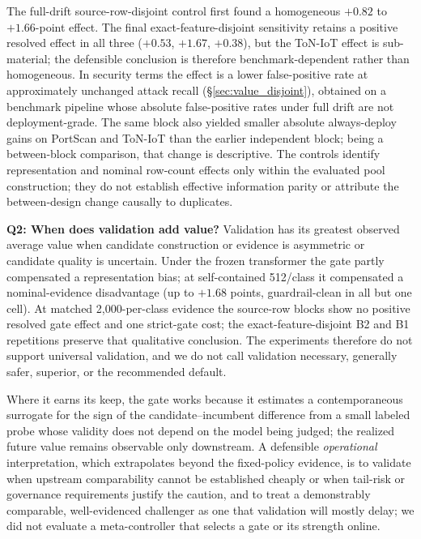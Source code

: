 \documentclass[a4paper,fleqn]{cas-sc}
\begin{document}
The full-drift source-row-disjoint control first found a homogeneous $+0.82$ to $+1.66$-point effect. The final exact-feature-disjoint sensitivity retains a positive resolved effect in all three ($+0.53$, $+1.67$, $+0.38$), but the ToN-IoT effect is sub-material; the defensible conclusion is therefore benchmark-dependent rather than homogeneous. In security terms the effect is a lower false-positive rate at approximately unchanged attack recall (\S\ref{sec:value_disjoint}), obtained on a benchmark pipeline whose absolute false-positive rates under full drift are not deployment-grade. The same block also yielded smaller absolute always-deploy gains on PortScan and ToN-IoT than the earlier independent block; being a between-block comparison, that change is descriptive. The controls identify representation and nominal row-count effects only within the evaluated pool construction; they do not establish effective information parity or attribute the between-design change causally to duplicates.

\textbf{Q2: When does validation add value?} Validation has its greatest observed average value when candidate construction or evidence is asymmetric or candidate quality is uncertain. Under the frozen transformer the gate partly compensated a representation bias; at self-contained 512/class it compensated a nominal-evidence disadvantage (up to $+1.68$ points, guardrail-clean in all but one cell). At matched 2{,}000-per-class evidence the source-row blocks show no positive resolved gate effect and one strict-gate cost; the exact-feature-disjoint B2 and B1 repetitions preserve that qualitative conclusion. The experiments therefore do not support universal validation, and we do not call validation necessary, generally safer, superior, or the recommended default.

Where it earns its keep, the gate works because it estimates a contemporaneous surrogate for the sign of the candidate--incumbent difference from a small labeled probe whose validity does not depend on the model being judged; the realized future value remains observable only downstream. A defensible \emph{operational} interpretation, which extrapolates beyond the fixed-policy evidence, is to validate when upstream comparability cannot be established cheaply or when tail-risk or governance requirements justify the caution, and to treat a demonstrably comparable, well-evidenced challenger as one that validation will mostly delay; we did not evaluate a meta-controller that selects a gate or its strength online.
\end{document}
